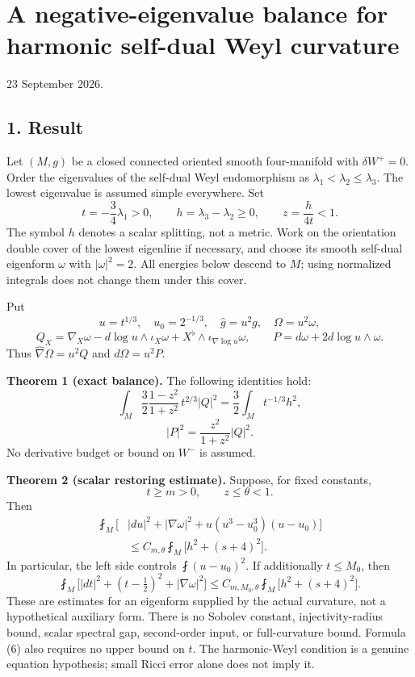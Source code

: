 \documentclass[
  11pt,
]{article}
\author{}
\date{23 September 2026}
\begin{document}
\hypertarget{a-negative-eigenvalue-balance-for-harmonic-self-dual-weyl-curvature}{%
\section{A negative-eigenvalue balance for harmonic self-dual Weyl
curvature}\label{a-negative-eigenvalue-balance-for-harmonic-self-dual-weyl-curvature}}

23 September 2026.

\hypertarget{result}{%
\subsection{1. Result}\label{result}}

Let \((M,g)\) be a closed connected oriented smooth four-manifold with
\(\delta W^+=0\). Order the eigenvalues of the self-dual Weyl
endomorphism as \(\lambda_1<\lambda_2\le\lambda_3\). The lowest
eigenvalue is assumed simple everywhere. Set \[
 t=-\frac34\lambda_1>0,\qquad h=\lambda_3-\lambda_2\ge0,
 \qquad z=\frac{h}{4t}<1.                                      \tag{1}
\] The symbol \(h\) denotes a scalar splitting, not a metric. Work on
the orientation double cover of the lowest eigenline if necessary, and
choose its smooth self-dual eigenform \(\omega\) with \(|\omega|^2=2\).
All energies below descend to \(M\); using normalized integrals does not
change them under this cover.

Put \[
 u=t^{1/3},\quad u_0=2^{-1/3},\quad \widehat g=u^2g,
 \quad\Omega=u^2\omega,
\] \[
 Q_X=\nabla_X\omega-d\log u\wedge\iota_X\omega
                      +X^\flat\wedge\iota_{\nabla\log u}\omega,
 \qquad P=d\omega+2d\log u\wedge\omega.                       \tag{2}
\] Thus \(\widehat\nabla\Omega=u^2Q\) and \(d\Omega=u^2P\).

\textbf{Theorem 1 (exact balance).} The following identities hold: \[
 \boxed{\int_M\frac32\frac{1-z^2}{1+z^2}\,t^{2/3}|Q|^2
       =\frac32\int_Mt^{-1/3}h^2,}                            \tag{3}
\] \[
 \boxed{|P|^2=\frac{z^2}{1+z^2}|Q|^2.}                       \tag{4}
\] No derivative budget or bound on \(W^-\) is assumed.

\textbf{Theorem 2 (scalar restoring estimate).} Suppose, for fixed
constants, \[
                   t\ge m>0,\qquad z\le\theta<1.
\tag{5}
\] Then \[
\boxed{\begin{split}
 \fint_M\big[&|du|^2+|\nabla\omega|^2
               +u(u^3-u_0^3)(u-u_0)\big]\\
 &\le C_{m,\theta}\fint_M\big[h^2+(s+4)^2\big].
\end{split}}                                                 \tag{6}
\] In particular, the left side controls \(\fint(u-u_0)^2\). If
additionally \(t\le M_0\), then \[
 \boxed{\fint_M\big[|dt|^2+(t-\tfrac12)^2+|\nabla\omega|^2\big]
 \le C_{m,M_0,\theta}\fint_M\big[h^2+(s+4)^2\big].}            \tag{7}
\] These are estimates for an eigenform supplied by the actual
curvature, not a hypothetical auxiliary form. There is no Sobolev
constant, injectivity-radius bound, scalar spectral gap, second-order
input, or full-curvature bound. Formula (6) also requires no upper bound
on \(t\). The harmonic-Weyl condition is a genuine equation hypothesis;
small Ricci error alone does not imply it.
\end{document}
